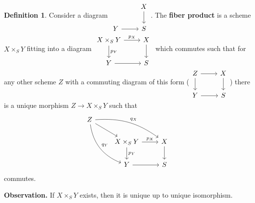 \documentclass{article}
\theoremstyle{definition}
\newtheorem{defn}{Definition}[section]
\begin{document}
\begin{defn}
    Consider a diagram $\begin{tikzcd}[]
         & X\\
        Y & S
        \arrow["", from=1-2, to=2-2]
        \arrow["", from=2-1, to=2-2]
    \end{tikzcd}$. The \textbf{fiber product} is a scheme $X \times_S Y$ fitting into a diagram $
        \begin{tikzcd}[]
           X \times_S Y & X\\
           Y & S
           \arrow["", from=1-2, to=2-2]
           \arrow["p_Y",from=1-1, to=2-1]
           \arrow["", from=2-1, to=2-2]
           \arrow["p_X", from=1-1, to=1-2]
       \end{tikzcd}
    $
    which commutes such that for any other scheme $Z$ with a commuting diagram of this form ($\begin{tikzcd}[]
        Z & X\\
        Y & S
        \arrow["", from=1-2, to=2-2]
        \arrow["",from=1-1, to=2-1]
        \arrow["", from=2-1, to=2-2]
        \arrow["", from=1-1, to=1-2]
    \end{tikzcd}$) there is a unique morphism $Z \to X \times_S Y$ such that 
    \[
        \begin{tikzcd}[]
            Z & &\\
            &X \times_S Y & X\\
            & Y & S
            \arrow["", from=2-3, to=3-3]
            \arrow["p_Y",from=2-2, to=3-2]
            \arrow["", from=3-2, to=3-3]
            \arrow["p_X", from=2-2, to=2-3]
            \arrow["", from=1-1, to=2-2]
            \arrow["q_X",from=1-1, to=2-3, bend left=20]
            \arrow["q_Y",from=1-1, to=3-2, bend right=30]
        \end{tikzcd}
    \]
    commutes.
\end{defn}
\textbf{Observation.} If $X \times_S Y$ exists, then it is unique up to unique isomorphism.
\vspace{1mm}
 
\end{document}
